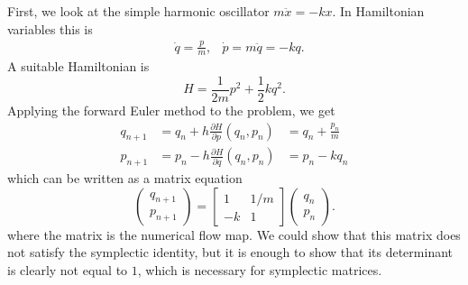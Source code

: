 \documentclass{report}
\theoremstyle{exampstyle} \newtheorem{example}[theorem]{Example}
\theoremstyle{exampstyle} \newtheorem{remark}[theorem]{Remark}
\theoremstyle{exampstyle} \newtheorem{definition}[theorem]{Definition}
\theoremstyle{exampstyle} \newtheorem{lemma}[theorem]{Lemma}
\begin{document}
First, we look at the simple harmonic oscillator $m \ddot{x} = -k x$.
In Hamiltonian variables this is
\begin{equation*}
	\begin{aligned}
		&\dot{q} = \frac{p}{m}, &\dot{p} = m\ddot{q} = -kq.
	\end{aligned}
\end{equation*}
A suitable Hamiltonian is
\begin{equation*}
	H = \frac{1}{2m}p^2 + \frac{1}{2}kq^2.
\end{equation*}
Applying the forward Euler method to the problem, we get
\begin{equation*}
	\begin{aligned}
		q_{n+1} &= q_n + h\frac{\partial H}{\partial p}(q_n, p_n) &= q_n + \frac{p_n}{m}\\
		p_{n+1} &= p_n - h\frac{\partial H}{\partial q}(q_n, p_n) &= p_n - kq_n
	\end{aligned}
\end{equation*}
which can be written as a matrix equation
\begin{equation*}
	\begin{pmatrix}
		q_{n+1} \\
		p_{n+1}
	\end{pmatrix} = \begin{bmatrix}
		1 & 1/m \\
		-k & 1
	\end{bmatrix} \begin{pmatrix}
		q_n \\
		p_n
	\end{pmatrix}.
\end{equation*}
where the matrix is the numerical flow map.
We could show that this matrix does not satisfy the symplectic identity,
but it is enough to show that its determinant is clearly not equal to $1$, which is necessary for symplectic matrices.
\end{document}
